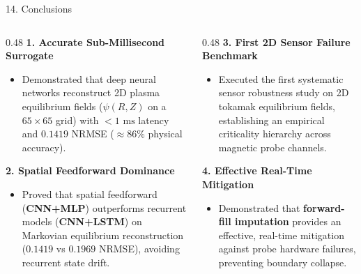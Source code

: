 \documentclass[aspectratio=169, 10pt]{beamer}
\begin{document}
\begin{frame}{14. Conclusions}
  \begin{columns}[T]
    \begin{column}{0.48\textwidth}
      \textbf{\color{NavyBlue} 1. Accurate Sub-Millisecond Surrogate}
      \begin{itemize}
        \item Demonstrated that deep neural networks reconstruct 2D plasma equilibrium fields ($\psi(R, Z)$ on a $65 \times 65$ grid) with $<1\text{ ms}$ latency and $0.1419$ NRMSE ($\approx 86\%$ physical accuracy).
      \end{itemize}
      \vspace{4pt}
      \textbf{\color{NavyBlue} 2. Spatial Feedforward Dominance}
      \begin{itemize}
        \item Proved that spatial feedforward (\textbf{CNN+MLP}) outperforms recurrent models (\textbf{CNN+LSTM}) on Markovian equilibrium reconstruction ($0.1419$ vs $0.1969$ NRMSE), avoiding recurrent state drift.
      \end{itemize}
    \end{column}

    \begin{column}{0.48\textwidth}
      \textbf{\color{NavyBlue} 3. First 2D Sensor Failure Benchmark}
      \begin{itemize}
        \item Executed the first systematic sensor robustness study on 2D tokamak equilibrium fields, establishing an empirical criticality hierarchy across magnetic probe channels.
      \end{itemize}
      \vspace{4pt}
      \textbf{\color{NavyBlue} 4. Effective Real-Time Mitigation}
      \begin{itemize}
        \item Demonstrated that \textbf{forward-fill imputation} provides an effective, real-time mitigation against probe hardware failures, preventing boundary collapse.
      \end{itemize}
    \end{column}
  \end{columns}
\end{frame}
\end{document}
